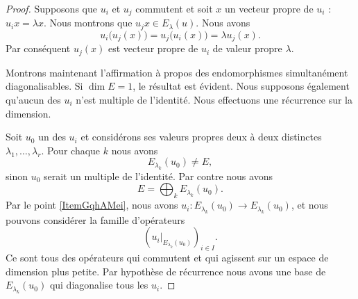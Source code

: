\begin{proof}

    Supposons que \( u_i\) et \( u_j\) commutent et soit \( x\) un vecteur propre de \( u_i\) : \( u_ix=\lambda x\). Nous montrons que \( u_jx\in E_{\lambda}(u)\). Nous avons
    \begin{equation}
        u_i\big( u_j(x) \big)=u_j\big( u_i(x) \big)=\lambda u_j(x).
    \end{equation}
    Par conséquent \( u_j(x)\) est vecteur propre de \( u_i\) de valeur propre \( \lambda\).

    Montrons maintenant l'affirmation à propos des endomorphismes simultanément diagonalisables. Si \( \dim E=1\), le résultat est évident. Nous supposons également qu'aucun des \( u_i\) n'est multiple de l'identité. Nous effectuons une récurrence sur la dimension.

    Soit \( u_0\) un des \( u_i\) et considérons ses valeurs propres deux à deux distinctes \( \lambda_1,\ldots, \lambda_r\). Pour chaque \( k\) nous avons
    \begin{equation}
        E_{\lambda_k}(u_0)\neq E,
    \end{equation}
    sinon \( u_0\) serait un multiple de l'identité. Par contre nous avons
    \begin{equation}
        E=\bigoplus_{k}E_{\lambda_k}(u_0).
    \end{equation}
    Par le point \ref{ItemGqhAMei}, nous avons \( u_i\colon E_{\lambda_k}(u_0)\to E_{\lambda_k}(u_0)\), et nous pouvons considérer la famille d'opérateurs
    \begin{equation}
        \left( u_i|_{E_{\lambda_k}(u_0)} \right)_{i\in I}.
    \end{equation}
    Ce sont tous des opérateurs qui commutent et qui agissent sur un espace de dimension plus petite. Par hypothèse de récurrence nous avons une base de \( E_{\lambda_k}(u_0)\) qui diagonalise tous les \( u_i\).
\end{proof}

